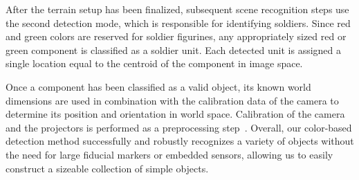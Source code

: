 \documentclass[review]{vgtc}                 %
\begin{document}
After the terrain setup has been finalized, subsequent scene
recognition steps use the second detection mode, which is responsible
for identifying soldiers.  Since red and green colors are reserved for
soldier figurines, any appropriately sized red or green component 
is classified as a soldier unit.  Each detected unit is assigned a
single location equal to the centroid of the component in image space.

Once a component has been classified as a valid object, its known
world dimensions are used in combination with the calibration data of
the camera to determine its position and orientation in world space.
Calibration of the camera and the projectors is performed as a
preprocessing step~\cite{Zhang2000}.  Overall,
our color-based detection method successfully and robustly recognizes
a variety of objects without the need for large fiducial markers or
embedded sensors, allowing us to easily construct a sizeable
collection of simple objects.





\end{document}
